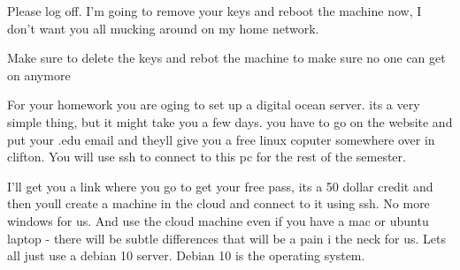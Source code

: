 \documentclass[10pt]{article}
\begin{document}
Please log off. I'm going to remove your keys and reboot the machine now, I
don't want you all mucking around on my home network.

{\LARGE Make sure to delete the keys and rebot the machine to make sure no one
can get on anymore}

For your homework you are oging to set up a digital ocean server. its a very
simple thing, but it might take you a few days. you have to go on the website
and put your .edu email and theyll give you a free linux coputer somewhere over
in clifton. You will use ssh to connect to this pc for the rest of the semester.

I'll get you a link where you go to get your free pass, its a 50 dollar credit
and then youll create a machine in the cloud and connect to it using ssh. No
more windows for us. And use the cloud machine even if you have a mac or ubuntu
laptop - there will be subtle differences that will be a pain i the neck for us.
Lets all just use a debian 10 server. Debian 10 is the operating system.
\end{document}
